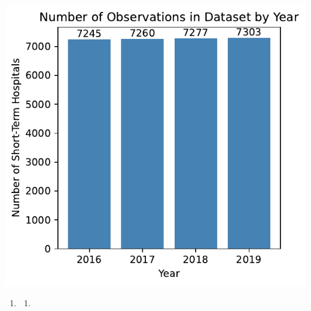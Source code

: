 \documentclass[
  letterpaper,
  DIV=11,
  numbers=noendperiod]{scrartcl}
\providecommand{\tightlist}{%
  \setlength{\itemsep}{0pt}\setlength{\parskip}{0pt}}\usepackage{longtable,booktabs,array}
\begin{document}
\includegraphics{pset4_template_files/figure-pdf/cell-3-output-1.pdf}

\begin{enumerate}
\def\labelenumi{\arabic{enumi}.}
\setcounter{enumi}{3}
\tightlist
\item
  \begin{enumerate}
  \def\labelenumii{\alph{enumii}.}
  \tightlist
  \item
  \end{enumerate}
\end{enumerate}
\end{document}
